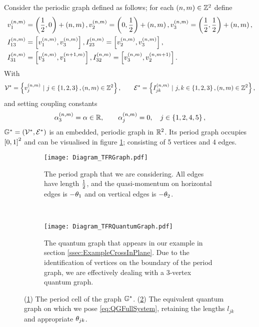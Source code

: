 Consider the periodic graph defined as follows; for each $\left( n,m \right)\in\mathbb{Z}^2$ define
\begin{align*}
	& v_1^{\left( n,m \right)} = \left( \frac{1}{2},0 \right) + \left( n,m \right), 
	v_2^{\left( n,m \right)} = \left( 0,\frac{1}{2} \right) + \left( n,m \right),
	v_3^{\left( n,m \right)} = \left( \frac{1}{2},\frac{1}{2} \right) + \left( n,m \right), \\
	& I_{13}^{\left( n,m \right)} = \left[ v_1^{\left( n,m \right)}, v_3^{\left( n,m \right)} \right],
	I_{23}^{\left( n,m \right)} = \left[ v_2^{\left( n,m \right)}, v_3^{\left( n,m \right)} \right], \\
	& I_{31}^{\left( n,m \right)} = \left[ v_3^{\left( n,m \right)}, v_1^{\left( n+1,m \right)} \right],
	I_{32}^{\left( n,m \right)} = \left[ v_3^{\left( n,m \right)}, v_2^{\left( n,m+1 \right)} \right].
\end{align*}
With 
\begin{align*}
	\vertSet^* = \clbracs{v_j^{\bracs{n,m}} \ \vert \ j\in\clbracs{1,2,3}, \bracs{n,m}\in\integers^2},
	\qquad \edgeSet^* = \clbracs{I_{jk}^{\bracs{n,m}} \ \vert \ j,k\in\clbracs{1,2,3}, \bracs{n,m}\in\integers^2},
\end{align*}
and setting coupling constants
\begin{align*}
	\alpha_3^{\left( n,m \right)} = \alpha \in\mathbb{R}, 
	\qquad \alpha_j^{\left( n,m \right)} = 0, \quad j\in\left\{ 1,2,4,5 \right\},
\end{align*}
$\mathbb{G}^* = \left( \mathcal{V}^*,\mathcal{E}^* \right)$ is an embedded, periodic graph in $\mathbb{R}^2$.
Its period graph occupies $\left[ 0,1 \right]^2$ and can be visualised in figure \ref{fig:Diagram_TFRGraph}; consisting of 5 vertices and 4 edges.
\begin{figure}[t]
	\centering
	\begin{subfigure}[t]{0.45\textwidth}
		\centering
		\texttt{[image: Diagram\_TFRGraph.pdf]}
		\caption{\label{fig:Diagram_TFRGraph} The period graph that we are considering. All edges have length $\frac{1}{2}$, and the quasi-momentum on horizontal edges is $-\theta_1$ and on vertical edges is $-\theta_2$.}
	\end{subfigure}
	~
	\begin{subfigure}[t]{0.45\textwidth}
		\centering
		\texttt{[image: Diagram\_TFRQuantumGraph.pdf]}
		\caption{\label{fig:Diagram_TFRQuantumGraph} The quantum graph that appears in our example in section \ref{ssec:ExampleCrossInPlane}. Due to the identification of vertices on the boundary of the period graph, we are effectively dealing with a 3-vertex quantum graph.}
	\end{subfigure}
	\caption{\label{fig:5VertexCross} (\ref{fig:Diagram_TFRGraph}) The period cell of the graph $\mathbb{G}^*$. (\ref{fig:Diagram_TFRQuantumGraph}) The equivalent quantum graph on which we pose \eqref{eq:QGFullSystem}, retaining the lengths $l_{jk}$ and appropriate $\theta_{jk}$.}
\end{figure}
